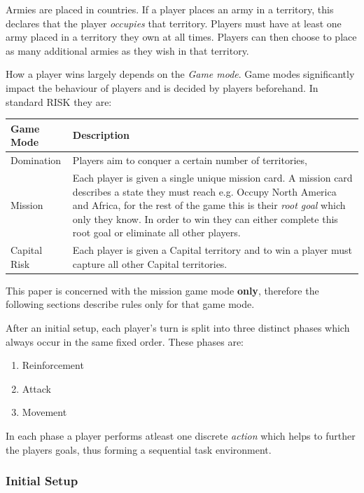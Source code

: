 \documentclass[parskip]{cs4rep}
\begin{document}
Armies are placed in countries. If a player places an army in a territory, this declares that the player \textit{occupies} that territory. Players must have at least one army placed in a territory they own at all times. Players can then choose to place as many additional armies as they wish in that territory.

How a player wins largely depends on the \textit{Game mode}. Game modes significantly impact the behaviour of players and is decided by players beforehand. In standard RISK they are:
\newline

\begin{tabular}{|l|p{11cm}|}
\hline 
\textbf{Game Mode} & \textbf{Description} \\ 
\hline 
Domination & Players aim to conquer a certain number of territories, \\ 
\hline 
Mission & Each player is given a single unique mission card. A mission card describes a state they must reach e.g. Occupy North America and Africa, for the rest of the game this is their \textit{root goal} which only they know. In order to win they can either complete this root goal or eliminate all other players. \\ 
\hline 
Capital Risk & Each player is given a Capital territory and to win a player must capture all other Capital territories. \\ 
\hline
\end{tabular} 
\newline

This paper is concerned with the mission game mode \textbf{only}, therefore the following sections describe rules only for that game mode.

After an initial setup, each player's turn is split into three distinct phases which always occur in the same fixed order. These phases are:

\begin{enumerate}
\item
Reinforcement
\item
Attack
\item
Movement
\newline
\end{enumerate}

In each phase a player performs atleast one discrete \textit{action} which helps to further the players goals, thus forming a sequential task environment.

\subsubsection{Initial Setup}
\end{document}
